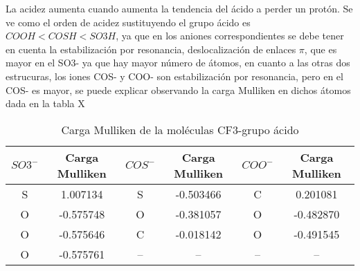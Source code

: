 La acidez aumenta cuando aumenta la tendencia del ácido a perder un protón.
Se ve como el orden de acidez sustituyendo el grupo ácido es $ COOH {<} COSH {<} SO3H $, ya que en los aniones correspondientes se debe tener en cuenta la estabilización por resonancia, deslocalización de enlaces $\pi$, que es mayor en el SO3- ya que hay mayor número de átomos, en cuanto a las otras dos estrucuras, los iones COS- y COO- son estabilización por resonancia, pero en el COS- es mayor, se puede explicar observando la carga Mulliken en dichos átomos dada en la tabla X

\begin{table}[H]
    \centering
    \begin{tabular}{|c|c|c|c|c|c|}
    \hline
    $SO3^-$ & Carga Mulliken &$COS^-$ & Carga Mulliken & $COO^-$ & Carga Mulliken \\ \hline
    S & 1.007134 & S & -0.503466 & C & 0.201081 \\ \hline
    O & -0.575748 & O & -0.381057 & O & -0.482870 \\ \hline
    O & -0.575646 & C & -0.018142 & O & -0.491545 \\ \hline
    O & -0.575761 & -- & -- & -- & -- \\ \hline
    \end{tabular}
    \caption{Carga Mulliken de la moléculas CF3-grupo ácido}
    \label{tab:my_label}
\end{table}

